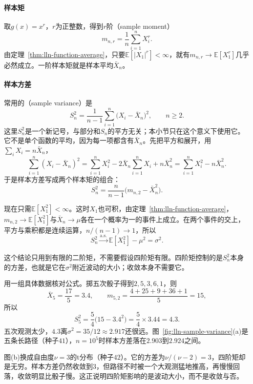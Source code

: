 \paragraph{样本矩}
取$g(x)=x^r$，$r$为正整数，得到$r$阶（sample moment）
\[
 m_{n,r}=\frac{1}{n}\sum_{i=1}^{n}X_i^r .
\]
由定理~\ref{thm:lln-function-average}，只要$\mathbb{E}[\lvert X_1\rvert^r]<\infty$，就有$m_{n,r}\to\mathbb{E}[X_1^r]$几乎必然成立。一阶样本矩就是样本平均$\bar{X}_n$。

\paragraph{样本方差}
常用的（sample variance）是
\begin{equation}
 S_n^{2}=\frac{1}{n-1}\sum_{i=1}^{n}\bigl(X_i-\bar{X}_n\bigr)^2,\qquad n\geq2 .
 \label{eq:lln-sample-variance}
\end{equation}
这里$S_n^2$是一个新记号，与部分和$S_n$的平方无关；本小节只在这个意义下使用它。它不是单个函数的平均，因为每一项都含有$\bar{X}_n$。先把平方和展开，用$\sum_iX_i=n\bar{X}_n$，
\[
 \sum_{i=1}^{n}(X_i-\bar{X}_n)^2=\sum_{i=1}^{n}X_i^2-2\bar{X}_n\sum_{i=1}^{n}X_i+n\bar{X}_n^2=\sum_{i=1}^{n}X_i^2-n\bar{X}_n^2 .
\]
于是样本方差写成两个样本矩的组合：
\[
 S_n^{2}=\frac{n}{n-1}\bigl(m_{n,2}-\bar{X}_n^2\bigr) .
\]

现在只需$\mathbb{E}[X_1^2]<\infty$。这时$X_1$也可积，由定理~\ref{thm:lln-function-average}，$m_{n,2}\to\mathbb{E}[X_1^2]$与$\bar{X}_n\to\mu$各在一个概率为一的事件上成立。在两个事件的交上，平方与乘积都是连续运算，$n/(n-1)\to1$，所以
\begin{equation}
 S_n^{2}\xrightarrow{\mathrm{a.s.}}\mathbb{E}[X_1^2]-\mu^2=\sigma^2 .
 \label{eq:lln-sample-variance-limit}
\end{equation}

这个结论只用到有限的二阶矩，不需要假设四阶矩有限。四阶矩控制的是$S_n^2$本身的方差，也就是它在$\sigma^2$附近波动的大小；收敛本身不需要它。

用一组具体数据核对公式。掷五次骰子得到$2,5,3,6,1$，则
\[
 \bar{X}_5=\frac{17}{5}=3.4,\qquad m_{5,2}=\frac{4+25+9+36+1}{5}=15 ,
\]
所以
\[
 S_5^2=\frac54\bigl(15-3.4^2\bigr)=\frac54\times3.44=4.3 .
\]
五次观测太少，$4.3$离$\sigma^2=35/12\approx2.917$还很远。图~\ref{fig:lln-sample-variance}(a)是五条长路径（种子$41$），$n=10^5$时样本方差落在$2.903$到$2.924$之间。

图(b)换成自由度$\nu=3$的t分布（种子$42$）。它的方差为$\nu/(\nu-2)=3$，四阶矩却是无穷。样本方差仍然收敛到$3$，但路径不时被一个大观测猛地推高，再慢慢回落，收敛明显比骰子慢。这正说明四阶矩影响的是波动大小，而不是收敛与否。


